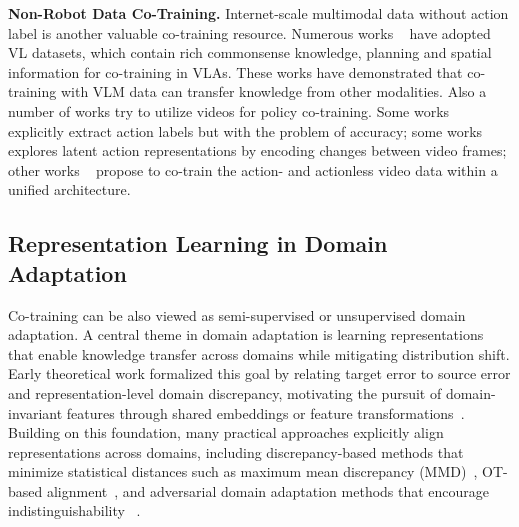 \textbf{Non-Robot Data Co-Training.}
Internet-scale multimodal data without action label is another valuable co-training resource.
Numerous works ~\cite{intelligence2025pi_, lee2025molmoact, zawalski2024robotic, zitkovich2023rt, cotraininglbm2025} have adopted VL datasets, which contain rich commonsense knowledge, planning and spatial information for co-training in VLAs.
These works have demonstrated that co-training with VLM data can transfer knowledge from other modalities.
Also a number of works try to utilize videos for policy co-training.
Some works ~\cite{kareer2025egomimic, lepert2025masquerade, luo2025being} explicitly extract action labels but with the problem of accuracy;
some works ~\cite{ye2024latent, zhou2024dino} explores latent action representations by encoding changes between video frames;
other works ~\cite{li2025unified, zhu2025unified, liang2025video} propose to co-train the action- and actionless video data within a unified architecture.


\subsection{Representation Learning in Domain Adaptation}
Co-training can be also viewed as semi-supervised or unsupervised domain adaptation.
A central theme in domain adaptation is learning representations that enable knowledge transfer across domains while mitigating distribution shift. 
Early theoretical work formalized this goal by relating target error to source error and representation-level domain discrepancy, motivating the pursuit of domain-invariant features through shared embeddings or feature transformations~\cite{ben2010theory, mansour2009domain}.    
Building on this foundation, many practical approaches explicitly align representations across domains, including discrepancy-based methods that minimize statistical distances such as maximum mean discrepancy (MMD)~\cite{long2015learning}, OT-based alignment~\cite{courty2017joint, damodaran2018deepjdot}, and adversarial domain adaptation methods that encourage indistinguishability ~\cite{ganin2016domain, tzeng2017adversarial}. 
